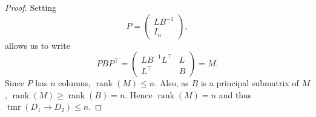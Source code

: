 \documentclass[a4paper, 12pt, reqno]{amsart}
\numberwithin{equation}{section}
\theoremstyle{plain}
\theoremstyle{remark}
\theoremstyle{definition}
\newcommand{\tmr}{\operatorname{tmr}}
\newcommand{\rank}{\operatorname{rank}}
\begin{document}
\begin{proof}
     
     Setting 
     \begin{equation*}
         P = \begin{pmatrix}
             LB^{-1} \\I_n
         \end{pmatrix},
     \end{equation*}
    allows us to write
    \begin{equation*}
      PBP^{\top} = \begin{pmatrix}
          LB^{-1}L^{\top} & L \\ L^{\top} & B
      \end{pmatrix}  = M.
    \end{equation*}
    Since $P$ has $n$ columns, $\rank(M) \le n$. Also, as $B$ is a principal submatrix of $M$, $\rank(M) \geq \rank(B) =n$. Hence $\rank(M) =n$ and thus $\tmr(D_1 \to D_2) \le n$.
\end{proof}
\end{document}
